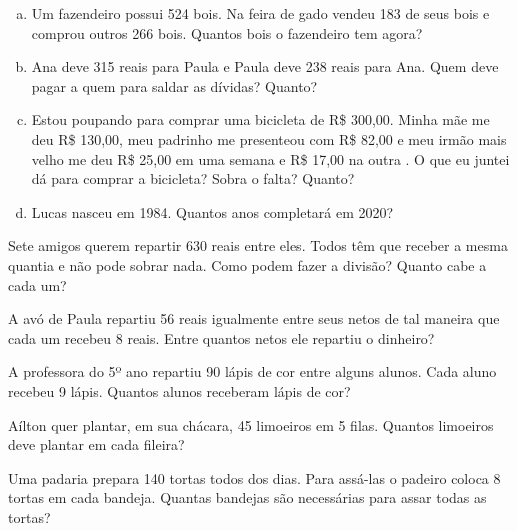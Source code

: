 \begin{enumerate}[a)]
		\item Um fazendeiro possui 524 bois. Na feira de gado vendeu 183 de seus bois e comprou outros 266 bois. Quantos bois o fazendeiro tem agora?
		\item Ana deve 315 reais para Paula e Paula deve 238 reais para Ana. Quem deve pagar a quem para saldar as dívidas? Quanto?
		\item Estou poupando para comprar uma bicicleta de R\$ 300,00. Minha mãe me deu R\$ 130,00, meu padrinho me presenteou com R\$ 82,00 e meu irmão mais velho me deu R\$ 25,00 em uma semana e R\$ 17,00 na outra . O que eu juntei dá para comprar a bicicleta? Sobra o falta? Quanto?
		\item Lucas nasceu em 1984. Quantos anos completará em 2020?		
	\end{enumerate}
	
	\item Sete amigos querem repartir 630 reais entre eles. Todos têm que receber a mesma quantia e não pode sobrar nada. Como podem fazer a divisão? Quanto cabe a cada um?
	\item A avó de Paula repartiu 56 reais igualmente entre seus netos de tal maneira que cada um recebeu 8 reais. Entre quantos netos ele repartiu o dinheiro?
	\item A professora do 5º ano repartiu 90 lápis de cor entre alguns alunos. Cada aluno recebeu 9 lápis. Quantos alunos receberam lápis de cor?
	\item Aílton quer plantar, em sua chácara, 45 limoeiros em 5 filas. Quantos limoeiros deve plantar em cada fileira?
	\item Uma padaria prepara 140 tortas todos dos dias. Para assá-las o padeiro coloca 8 tortas em cada bandeja. Quantas bandejas são necessárias para assar todas as tortas?
	
